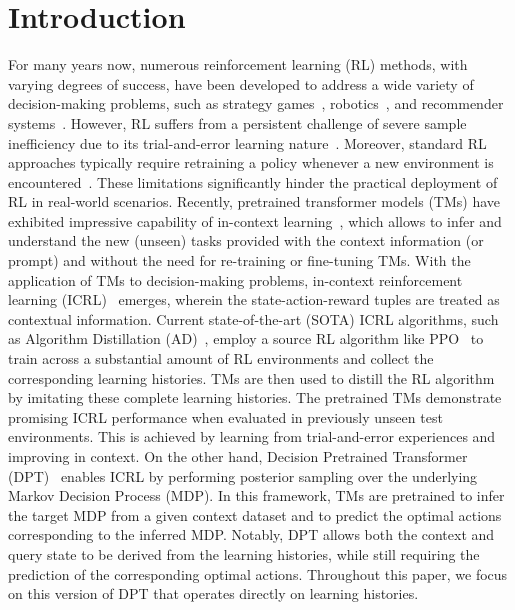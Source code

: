 \documentclass{article}
\begin{document}
\section{Introduction}
\label{section_introduction}
For many years now, numerous reinforcement learning (RL) methods, with varying degrees of success, have been developed to address a wide variety of decision-making problems, such as strategy games~\citep{mnih2013playing, mnih2015human}, robotics~\citep{levine2016end, duan2016benchmarking}, and recommender systems~\citep{afsar2022reinforcement, lin2023survey}.
However, RL suffers from a persistent challenge of severe sample inefficiency due to its trial-and-error learning nature~\cite{sutton2018reinforcement}. Moreover, standard RL approaches typically require retraining a policy whenever a new environment is encountered~\cite{beck2023survey}. These limitations significantly hinder the practical deployment of RL in real-world scenarios.
Recently, pretrained transformer models (TMs) have exhibited impressive capability of in-context learning~\citep{dong2022survey, li2023transformers, wei2023larger, wies2024learnability}, which allows to infer and understand the new (unseen) tasks provided with the context information (or prompt) and without the need for re-training or fine-tuning TMs.
With the application of TMs to decision-making problems, in-context reinforcement learning (ICRL)~\citep{laskin2022context, lin2023transformers, sinii2023context, zisman2023emergence, lee2024supervised} emerges, wherein the state-action-reward tuples are treated as contextual information.
Current state-of-the-art (SOTA) ICRL algorithms, such as Algorithm Distillation (AD)~\cite{laskin2022context}, employ a source RL algorithm like PPO~\cite{schulman2017proximal} to train across a substantial amount of RL environments and collect the corresponding learning histories. TMs are then used to distill the RL algorithm by imitating these complete learning histories. The pretrained TMs demonstrate promising ICRL performance when evaluated in previously unseen test environments. This is achieved by learning from trial-and-error experiences and improving in context.
On the other hand, Decision Pretrained Transformer (DPT)~\cite{lee2024supervised} enables ICRL by performing posterior sampling over the underlying Markov Decision Process (MDP). In this framework, TMs are pretrained to infer the target MDP from a given context dataset and to predict the optimal actions corresponding to the inferred MDP. Notably, DPT allows both the context and query state to be derived from the learning histories, while still requiring the prediction of the corresponding optimal actions. Throughout this paper, we focus on this version of DPT that operates directly on learning histories.
\end{document}

